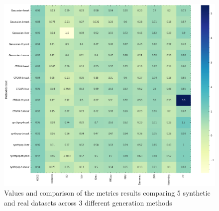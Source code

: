     \begin{figure}[htbp]
        \centering
        \caption{Values and comparison of the metrics results comparing 5 synthetic and real datasets across 3 different generation methods}\label{fig:synth_heat} 
        \includegraphics[scale=0.60]{figures/heatmap-synth.png}
        \end{figure}
